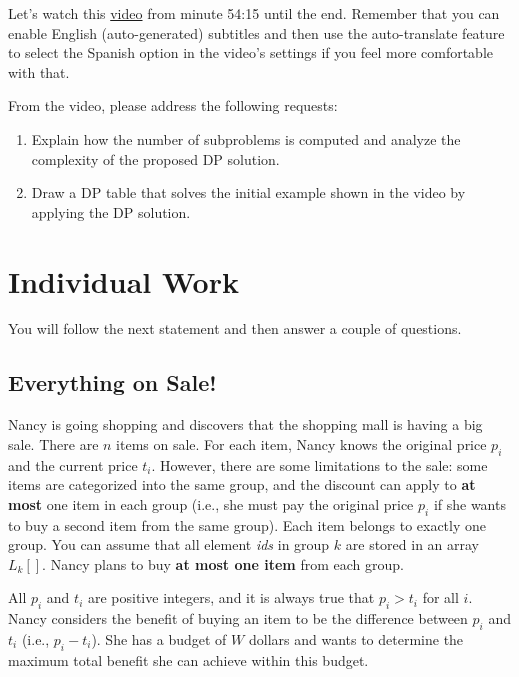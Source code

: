 \documentclass[11pt]{article}
\begin{document}
Let's watch this \href{https://ocw.mit.edu/courses/6-046j-design-and-analysis-of-algorithms-spring-2015/resources/lecture-10-dynamic-programming-advanced-dp/}{video} from minute 54:15 until the end. Remember that you can enable English (auto-generated) subtitles and then use the auto-translate feature to select the Spanish option in the video's settings if you feel more comfortable with that.

From the video, please address the following requests:

\begin{tcolorbox}[title=Exercises]
    \begin{enumerate}
        \item Explain how the number of subproblems is computed and analyze the complexity of the proposed DP solution.
        \item Draw a DP table that solves the initial example shown in the video by applying the DP solution.
    \end{enumerate}
\end{tcolorbox}

\section{Individual Work}
You will follow the next statement and then answer a couple of questions.

\subsection{Everything on Sale!}
Nancy is going shopping and discovers that the shopping mall is having a big sale. There are $n$ items on sale. For each item, Nancy knows the original price $p_i$ and the current price $t_i$. However, there are some limitations to the sale: some items are categorized into the same group, and the discount can apply to \textbf{at most} one item in each group (i.e., she must pay the original price $p_i$ if she wants to buy a second item from the same group). Each item belongs to exactly one group. You can assume that all element \textit{ids} in group $k$ are stored in an array $L_k []$. Nancy plans to buy \textbf{at most one item} from each group.

All $p_i$ and $t_i$ are positive integers, and it is always true that $p_i > t_i$ for all $i$. Nancy considers the benefit of buying an item to be the difference between $p_i$ and $t_i$ (i.e., $p_i - t_i$). She has a budget of $W$ dollars and wants to determine the maximum total benefit she can achieve within this budget.
\end{document}
